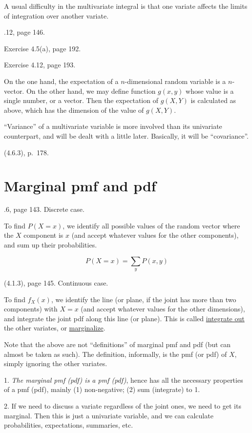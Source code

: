 \documentclass[12pt]{article}
\begin{document}
A usual difficulty in the multivariate integral
is that one variate affects the limits of integration over another
variate.

.12, page 146.

\example Exercise 4.5(a), page 192.

\example Exercise 4.12, page 193.

On the one hand,
the expectation of a $n$-dimensional random variable
is a $n$-vector.
On the other hand,
we may define function $g(x,y)$ whose value is a single number, or a
vector. Then the expectation of $g(X,Y)$ is calculated as above,
which has the dimension of the value of $g(X,Y)$.

``Variance'' of a multivariate variable is more involved than its
univariate counterpart, and will be dealt with a little later.
Basically, it will be ``covariance''.


\alert[Generalization]%
(4.6.3), p.~178.

\section{Marginal pmf and pdf}

.6, page 143. Discrete case.

To find $P(X = x)$, we identify all possible values of the
random vector where the $X$ component is $x$
(and accept whatever values for the other components),
and sum up their probabilities.

\[
P(X = x) = \sum_y P(x, y)
\]

\theorem (4.1.3), page 145. Continuous case.

To find $f_X(x)$, we identify the line (or plane, if the joint has more
than two components) with $X = x$ (and accept whatever values
for the other dimensions), and integrate the joint pdf along this line (or
plane).
This is called \underline{integrate out} the other variates,
or \underline{marginalize}.

Note that the above are not ``definitions'' of marginal pmf and pdf
(but can almost be taken as such).
The definition, informally, is the pmf (or pdf) of $X$,
simply ignoring the other variates.

\alert
1. \emph{The marginal pmf (pdf) is a pmf (pdf)},
hence has all the necessary properties of a pmf (pdf),
mainly (1) non-negative; (2) sum (integrate) to 1.

2. If we need to discuss a variate regardless of the joint ones,
we need to get its marginal. Then this is just a univariate variable,
and we can calculate probabilities, expectations, summaries, etc.
\end{document}
